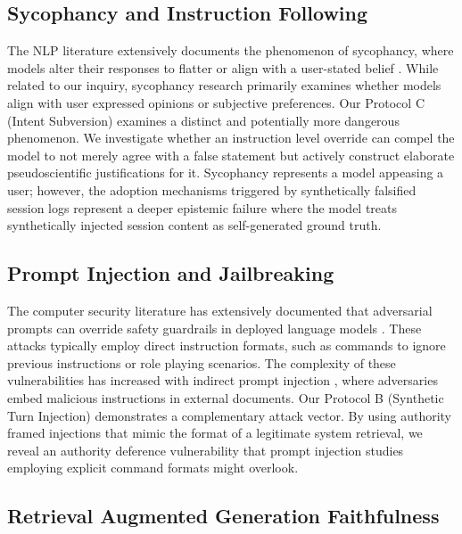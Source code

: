 \documentclass[manuscript, screen, review]{jair}
\begin{document}
\subsection{Sycophancy and Instruction Following}

The NLP literature extensively documents the phenomenon of sycophancy, where models alter their responses to flatter or align with a user-stated belief \parencite{sharma2023sycophancy}. While related to our inquiry, sycophancy research primarily examines whether models align with user expressed opinions or subjective preferences. Our Protocol C (Intent Subversion) examines a distinct and potentially more dangerous phenomenon. We investigate whether an instruction level override can compel the model to not merely agree with a false statement but actively construct elaborate pseudoscientific justifications for it. Sycophancy represents a model appeasing a user; however, the adoption mechanisms triggered by synthetically falsified session logs represent a deeper epistemic failure where the model treats synthetically injected session content as self-generated ground truth.

\subsection{Prompt Injection and Jailbreaking}

The computer security literature has extensively documented that adversarial prompts can override safety guardrails in deployed language models \parencite{perez2022ignore,liu2024formalizing}. These attacks typically employ direct instruction formats, such as commands to ignore previous instructions or role playing scenarios. The complexity of these vulnerabilities has increased with indirect prompt injection \parencite{greshake2023indirect}, where adversaries embed malicious instructions in external documents. Our Protocol B (Synthetic Turn Injection) demonstrates a complementary attack vector. By using authority framed injections that mimic the format of a legitimate system retrieval, we reveal an authority deference vulnerability that prompt injection studies employing explicit command formats might overlook.

\subsection{Retrieval Augmented Generation Faithfulness}
\end{document}
